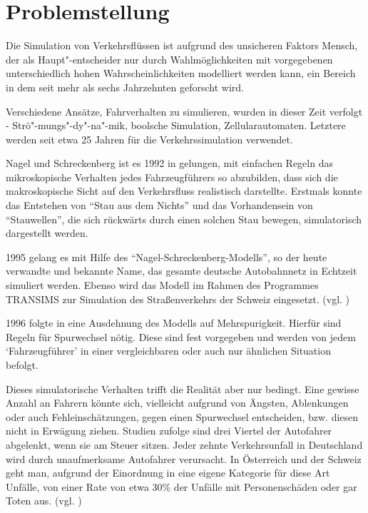 \section{Problemstellung}
\label{sec:problemstellung}


Die Simulation von Verkehrsflüssen ist aufgrund des unsicheren Faktors Mensch, der als Haupt"-entscheider nur durch Wahlmöglichkeiten mit vorgegebenen unterschiedlich hohen Wahrscheinlichkeiten modelliert werden kann, ein Bereich in dem seit mehr als sechs Jahrzehnten geforscht wird.

Verschiedene Ansätze, Fahrverhalten zu simulieren, wurden in dieser Zeit verfolgt - Strö"-mungs"-dy"-na"-mik, boolsche Simulation, Zellularautomaten. Letztere werden seit etwa 25 Jahren für die Verkehrssimulation verwendet.

Nagel und Schreckenberg ist es 1992 in \cite{na-sch} gelungen, mit einfachen Regeln das mikroskopische Verhalten jedes Fahrzeugführers so abzubilden, dass sich die makroskopische Sicht auf den Verkehrsfluss realistisch darstellte.
Erstmals konnte das Entstehen von \enquote{Stau aus dem Nichts} und das Vorhandensein von \enquote{Stauwellen}, die sich rückwärts durch einen solchen Stau bewegen, simulatorisch dargestellt werden.

1995 gelang es mit Hilfe des \enquote{Nagel-Schreckenberg-Modells}, so der heute verwandte und bekannte Name, das gesamte deutsche Autobahnnetz in Echtzeit simuliert werden. 
Ebenso wird das Modell im Rahmen des Programmes TRANSIMS zur Simulation des Straßenverkehrs der Schweiz eingesetzt. (vgl. \cite{spahn-da})

1996 folgte in \cite{multi-lane} eine Ausdehnung des Modells auf Mehrspurigkeit.  
Hierfür sind Regeln für Spurwechsel nötig.
Diese sind fest vorgegeben und werden von jedem \enquote*{Fahrzeugführer} in einer vergleichbaren oder auch nur ähnlichen Situation befolgt.

Dieses simulatorische Verhalten trifft die Realität aber nur bedingt.
Eine gewisse Anzahl an Fahrern könnte sich, vielleicht aufgrund von Ängsten, Ablenkungen oder auch Fehleinschätzungen, gegen einen Spurwechsel entscheiden, bzw. diesen nicht in Erwägung ziehen.
Studien zufolge sind drei Viertel der Autofahrer abgelenkt, wenn sie am Steuer sitzen. 
Jeder zehnte Verkehrsunfall in Deutschland wird durch unaufmerksame Autofahrer verursacht. 
In Österreich und der Schweiz geht man, aufgrund der Einordnung in eine eigene Kategorie für diese Art Unfälle, von einer Rate von etwa 30\% der Unfälle mit Personenschäden oder gar Toten aus. (vgl. \cite{dvr-studie})

